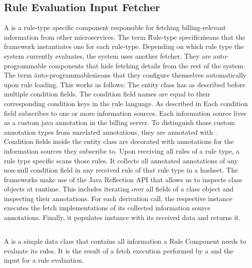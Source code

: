 \subsection{Rule Evaluation Input Fetcher}\label{subsec:rule-evaluation-input-fetcher}
A \REIF is a rule-type specific component responsible for fetching billing-relevant information from other \AV microservices.
The term \"Rule-type specific\" means that the framework instantiates one \REIF for each rule-type.
Depending on which rule type the system currently evaluates, the system uses another fetcher.
They are auto-programmable components that hide fetching details from the rest of the system.
The term \"auto-programmable\" means that they configure themselves automatically upon rule loading.
This works as follows: The  entity class has as described before multiple condition fields.
The condition field names are equal to their corresponding condition keys in the rule language.
As described in \addref Each condition field subscribes to one or more information sources.
Each information source lives as a custom java annotation in the billing server.
To distinguish those custom annotation types from unrelated annotations, they are annotated with .
Condition fields inside the  entity class are decorated with annotations for the information sources they subscribe to.
Upon receiving all rules of a rule type, a rule type specific  scans those rules.
It collects all  annotated annotations of any non-null condition field in any received rule of that rule type in a hashset.
The frameworks make use of the Java Reflection API that allows us to inspects class objects at runtime.
This includes iterating over all fields of a class object and inspecting their annotations.
For each derivation call, the respective  instance executes the fetch implementations of its collected information source annotations.
Finally, it populates \REI instance with its received data and returns it.

\subsection{\REI}\label{subsec:rei}
A \REI is a simple data class that contains all information a Rule Component needs to evaluate its rules.
It is the result of a fetch execution performed by a \REIF and the input for a rule evaluation.


